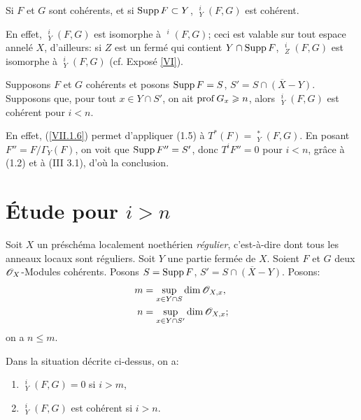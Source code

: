 \begin{lemme}\label{VII.1.6}
Si $F$ et $G$ sont coh\'erents, et si $\operatorname{Supp} F \subset Y$, $\mathop{\underline{\mathrm{Ext}}}\nolimits^i_Y (F, G)$ est coh\'erent.
\end{lemme}

En effet, $\mathop{\underline{\mathrm{Ext}}}\nolimits^i_Y (F, G)$ est isomorphe \`a $\mathop{\underline{\mathrm{Ext}}}\nolimits^i (F, G)$; ceci est valable sur tout espace annel\'e $X$, d'ailleurs: si $Z$ est un ferm\'e qui contient $Y \cap \operatorname{Supp} F$, $\mathop{\underline{\mathrm{Ext}}}\nolimits^i_Z (F, G)$ est isomorphe \`a $\mathop{\underline{\mathrm{Ext}}}\nolimits^i_Y (F, G)$ (cf. Expos\'e \ref{VI}).

\begin{proposition}\label{VII.1.7}
\hspace*{3mm}Supposons $F$ et $G$ coh\'erents et posons $\operatorname{Supp} F = S$, $S' = \overline{S \cap (X-Y)}$. Supposons que, pour tout $x \in Y \cap S'$, on ait $\operatorname{prof} G_x \geqslant n$, alors $\mathop{\underline{\mathrm{Ext}}}\nolimits^i_Y (F, G)$ est coh\'erent pour $i < n$.
\end{proposition}

En effet, (\ref{VII.1.6}) permet d'appliquer (1.5) \`a $T^{\ast}(F) = \mathop{\underline{\mathrm{Ext}}}\nolimits^{\ast}_Y (F, G)$. En posant $F'' = F/ \Gamma_Y (F)$, on voit que $\operatorname{Supp} F'' = S'$, donc $T^i F'' = 0$ pour $i < n$, gr\^ace \`a (1.2) et \`a (III 3.1), d'o\`u la conclusion.

\section{\'Etude pour $i>n$}\label{VII.2}

Soit $X$ un pr\'esch\'ema localement noeth\'erien \emph{régulier}, c'est-\`a-dire dont tous les anneaux locaux sont r\'eguliers. Soit $Y$ une partie ferm\'ee de $X$. Soient $F$ et $G$ deux $\mathscr{O}_X$-Modules coh\'erents. Posons $S = \operatorname{Supp} F$, $S' = \overline{S \cap (X - Y)}$. Posons:
\begin{align*}
m& = \sup_{x \in Y \cap S} \dim {\mathscr O}_{X, x},\\
n &= \sup_{x \in Y \cap S'} \dim {\mathscr O}_{X, x};
\end{align*}
on a $n \leq m$.

\begin{proposition}\label{VII.2.1}
Dans la situation d\'ecrite ci-dessus, on a:
\begin{enumerate}
\item
$\mathop{\underline{\mathrm{Ext}}}\nolimits^i_Y (F, G) = 0$ si $i > m$,

\item
$\mathop{\underline{\mathrm{Ext}}}\nolimits^i_Y (F, G)$ est coh\'erent si $i > n$.
\end{enumerate}
\end{proposition}

